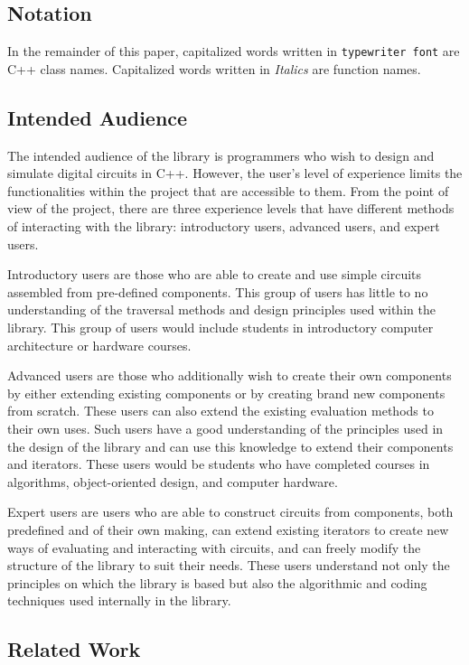 \documentclass{article}
\newcommand{\ClassName}[1]{\texttt{#1}}
\newcommand{\FunctionName}[1]{\textit{#1}}
\begin{document}
\subsection{Notation}

In the remainder of this paper, capitalized words written in \ClassName{typewriter font} are C++ class names. Capitalized words written in \FunctionName{Italics} are function names.

\subsection{Intended Audience}

The intended audience of the library is programmers who wish to design and simulate digital circuits in C++. However, the user's level of experience limits the functionalities within the project that are accessible to them. From the point of view of the project, there are three experience levels that have different methods of interacting with the library: introductory users, advanced users, and expert users.

Introductory users are those who are able to create and use simple circuits assembled from pre-defined components. This group of users has little to no understanding of the traversal methods and design principles used within the library. This group of users would include students in introductory computer architecture or hardware courses.

Advanced users are those who additionally wish to create their own components by either extending existing components or by creating brand new components from scratch. These users can also extend the existing evaluation methods to their own uses. Such users have a good understanding of the principles used in the design of the library and can use this knowledge to extend their components and iterators. These users would be students who have completed courses in algorithms, object-oriented design, and computer hardware.

Expert users are users who are able to construct circuits from components, both predefined and of their own making, can extend existing iterators to create new ways of evaluating and interacting with circuits, and can freely modify the structure of the library to suit their needs. These users understand not only the principles on which the library is based but also the algorithmic and coding techniques used internally in the library.

\subsection{Related Work}
\end{document}
